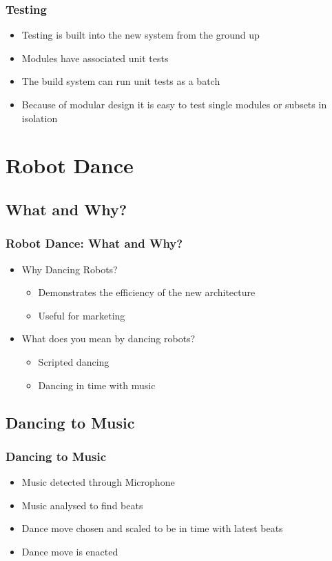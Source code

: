 \documentclass{beamer}
\begin{document}
\begin{frame}
	\frametitle{Testing}

	\begin{itemize}
		\item Testing is built into the new system from the ground up
		\item Modules have associated unit tests
		\item The build system can run unit tests as a batch
		\item Because of modular design it is easy to test single modules or subsets in isolation
	\end{itemize}
\end{frame}

\section{Robot Dance}
	\begin{frame}
		\sectionpage %
	\end{frame}
	\subsection{What and Why?} %
	\begin{frame}
		\frametitle{Robot Dance: What and Why?}
		\begin{itemize}
			\item Why Dancing Robots?
			\begin{itemize}
				\item Demonstrates the efficiency of the new architecture
				\item Useful for marketing
			\end{itemize}
			\item What does you mean by dancing robots?
			\begin{itemize}
				\item Scripted dancing
				\item Dancing in time with music
			\end{itemize}
		\end{itemize}
	\end{frame}
	\subsection{Dancing to Music} %
	\begin{frame}
		\frametitle{Dancing to Music}
		\begin{itemize}
			\item Music detected through Microphone
			\item Music analysed to find beats
			\item Dance move chosen and scaled to be in time with latest beats
			\item Dance move is enacted
		\end{itemize}
	\end{frame}	
\end{document}
